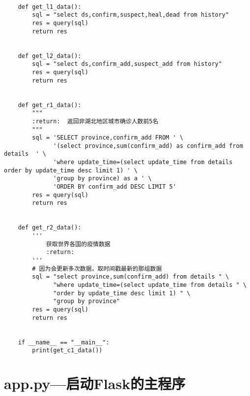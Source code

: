 \begin{lstlisting}
    
    def get_l1_data():
        sql = "select ds,confirm,suspect,heal,dead from history"
        res = query(sql)
        return res
    
    
    def get_l2_data():
        sql = "select ds,confirm_add,suspect_add from history"
        res = query(sql)
        return res
    
    
    def get_r1_data():
        """
        :return:  返回非湖北地区城市确诊人数前5名
        """
        sql = 'SELECT province,confirm_add FROM ' \
              '(select province,sum(confirm_add) as confirm_add from details  ' \
              'where update_time=(select update_time from details order by update_time desc limit 1) ' \
              'group by province) as a ' \
              'ORDER BY confirm_add DESC LIMIT 5'
        res = query(sql)
        return res
    
    
    def get_r2_data():
        '''
            获取世界各国的疫情数据
            :return:
        '''
        # 因为会更新多次数据，取时间戳最新的那组数据
        sql = "select province,sum(confirm_add) from details " \
              "where update_time=(select update_time from details " \
              "order by update_time desc limit 1) " \
              "group by province"
        res = query(sql)
        return res
    
    
    if __name__ == "__main__":
        print(get_c1_data())
\end{lstlisting}    

\section{app.py---启动Flask的主程序}

